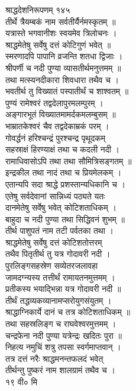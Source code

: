 \documentclass[11pt, openany]{book}
\begin{document}
{{{{{{{{{{{{{{{{{{{{{{{{{{{{{{{{{{{{{{{{{{{{{{{ }{ श्राद्धदेशनिरूपणम् १४५}{\\
तीर्थे त्रैयम्बकं नाम सर्वतीर्यैर्नमस्कृतम् ॥\\
यत्रास्ते भगवानीशः स्वयमेव त्रिलोचनः ।\\
श्राद्धमेतेषु सर्वेषु दत्तं कोटिगुणं भवेत् ॥\\
स्मरणादपि पापानि व्रजन्ति शतधा द्विजाः ।\\
श्रीपर्णी च नदी पुण्या व्यासतीर्थमनुत्तमम् ॥\\
तथा मत्स्यनदीकारा शिवधारा तथैव च ।\\
भवतीर्थ तु विख्यातं पस्पातीर्थं च शाश्वतम् ॥\\
पुण्यं रामेश्वरं तद्वदेलापुरमलम्पुरम् ।\\
अङ्गारभूतं विख्यातमामर्दकमलम्बुसम् ॥\\
भाम्रातकेश्वरं चैव तद्वदेकाम्रकं परम् ।\\
गोवर्द्धनं हरिश्चन्द्रं पुरश्चन्द्र पृथूदकम् \textbar{}\textbar{}\\
सहस्राक्षं हिरण्याक्षं तथा च कदली नदी ।\\
रामाधिवासोऽपि तथा तथा सौमित्रिसङ्गतम् ॥\\
इन्द्रकील तथा नादं तथा च प्रियमेलकम् ।\\
एतान्यपि सदा श्राद्धे प्रशस्तान्यधिकानि च ।\\
एतेषु सर्वदेवानां सान्निध्यं पठ्यते यतः \textbar{}\textbar{}\\
दानमेतेषु सर्वेषु भवेत् कोटिशताधिकम् ।\\
बाहुदा च नदी पुण्या तथा सिद्धिवनं शुभम् ॥\\
तीर्थ पाशुपतं नाम तटी पर्वतका तथा ।\\
श्राद्धमेतेषु सर्वेषु दत्तं कोटिशतोत्तरम् \textbar{}\textbar{}\\
तथैव पितृतीर्थ तु यत्र गोदावरी नदी ।\\
पुरलिङ्गसहस्रेण सव्येतरजलावहा \textbar{}\textbar{}\\
जामदग्न्यस्य तत्तीर्थं रामायतनमुत्तमम् ।\\
प्रतीकस्य भयाद्भिन्ना यत्र गोदावरी नदी ॥\\
तीर्थं तद्धव्यकव्यानामप्सरोयुगसंयुतम् ।\\
श्राद्धाग्निकार्ये दानं च तत्र कोटिशताधिकम् ॥\\
तथा सहस्रलिङ्ग च राघवेश्वरमुत्तमम् ।\\
चन्द्रफेना नदी पुण्या यत्रेन्द्रः खदितः पुरा ॥\\
निहत्य नमुचिं शत्रु तपसा स्वर्गमाप्तवान् ।\\
तत्र दत्तं नरैः श्राद्धमनन्तफलदं भवेत् \textbar{}\textbar{}\\
तीर्थन्तु पुष्करं नाम शालग्रामं तथैव च ।\\
१९ वी० मि\\


}}}}}}}}}}}}}}}}}}}}}}}}}}}}}}}}}}}}}}}}}}}}}}}
\end{document}

